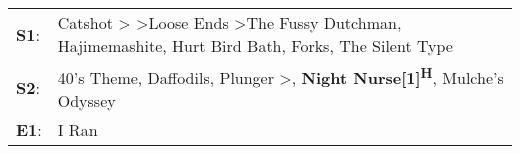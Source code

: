 \begin{supertabular}{p{0.03\textwidth}p{0.92\textwidth}}
 \textbf{S1}:  &  Catshot\textsuperscript{} \textgreater {}\textsuperscript{} \textgreater \enspace Loose Ends\textsuperscript{} \textgreater \enspace The Fussy Dutchman\textsuperscript{}, \enspace Hajimemashite\textsuperscript{}, \enspace Hurt Bird Bath\textsuperscript{}, \enspace Forks\textsuperscript{}, \enspace The Silent Type\textsuperscript{}  \enspace  \\
 \textbf{S2}:  &                                                                                                    40's Theme\textsuperscript{}, \enspace Daffodils\textsuperscript{}, \enspace Plunger\textsuperscript{} \textgreater {}\textsuperscript{}, \enspace \textbf{Night Nurse[1]\textsuperscript{H}}, \enspace Mulche's Odyssey\textsuperscript{}  \enspace  \\
 \textbf{E1}:  &                                                                                                                                                                                                                                                                                                                                  I Ran\textsuperscript{}  \enspace  \\
\end{supertabular}
